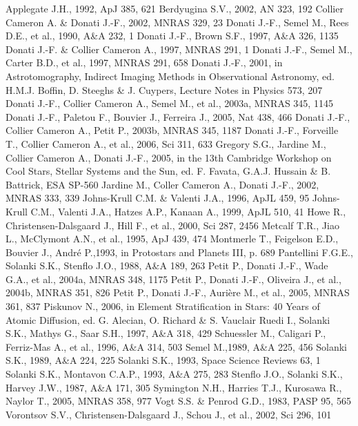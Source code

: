 \documentclass[11pt,twoside]{article}
\begin{document}
\begin{thebibliography}{}
\bibitem[]{} Applegate J.H., 1992, ApJ 385, 621
\bibitem[]{} Berdyugina S.V., 2002, AN 323, 192
\bibitem[]{} Collier Cameron A. \& Donati J.-F., 2002, MNRAS 329, 23
\bibitem[]{} Donati J.-F., Semel M., Rees D.E., et al., 1990, A\&A 232, 1
\bibitem[]{} Donati J.-F., Brown S.F., 1997, A\&A 326, 1135 
\bibitem[]{} Donati J.-F. \& Collier Cameron A., 1997, MNRAS 291, 1
\bibitem[]{} Donati J.-F., Semel M., Carter B.D., et al., 1997, MNRAS 291, 658
\bibitem[]{} Donati J.-F., 2001, in Astrotomography, Indirect Imaging Methods in Observational Astronomy, ed. H.M.J. Boffin, D. Steeghs \& J. Cuypers, Lecture Notes in Physics 573, 207
\bibitem[]{} Donati J.-F., Collier Cameron A., Semel M., et al., 2003a, MNRAS 345, 1145
\bibitem[]{} Donati J.-F., Paletou F., Bouvier J., Ferreira J., 2005, Nat 438, 466
\bibitem[]{} Donati J.-F., Collier Cameron A., Petit P., 2003b, MNRAS 345, 1187
\bibitem[]{} Donati J.-F., Forveille T., Collier Cameron A., et al., 2006, Sci 311, 633
\bibitem[]{} Gregory S.G., Jardine M., Collier Cameron A., Donati J.-F., 2005, in the 13th Cambridge Workshop on Cool Stars, Stellar Systems and the Sun, ed. F. Favata, G.A.J. Hussain \& B. Battrick, ESA SP-560
\bibitem[]{} Jardine M., Coller Cameron A., Donati J.-F., 2002, MNRAS 333, 339
\bibitem[]{} Johns-Krull C.M. \& Valenti J.A., 1996, ApJL 459, 95
\bibitem[]{} Johns-Krull C.M., Valenti J.A., Hatzes A.P., Kanaan A., 1999, ApJL 510, 41
\bibitem[]{} Howe R., Christensen-Dalsgaard J., Hill F., et al., 2000, Sci 287, 2456
\bibitem[]{} Metcalf T.R., Jiao L., McClymont A.N., et al., 1995, ApJ 439, 474
\bibitem[]{} Montmerle T., Feigelson E.D., Bouvier J., Andr\'e P.,1993, in Protostars and Planets III, p. 689 
\bibitem[]{} Pantellini F.G.E., Solanki S.K., Stenflo J.O., 1988, A\&A 189, 263
\bibitem[]{} Petit P., Donati J.-F., Wade G.A., et al., 2004a, MNRAS 348, 1175
\bibitem[]{} Petit P., Donati J.-F., Oliveira J., et al., 2004b, MNRAS 351, 826
\bibitem[]{} Petit P., Donati J.-F., Auri\`ere M., et al., 2005, MNRAS 361, 837
\bibitem[]{} Piskunov N., 2006, in Element Stratification in Stars: 40 Years of Atomic Diffusion, ed. G. Alecian, O. Richard \& S. Vauclair
\bibitem[]{} Ruedi I., Solanki S.K., Mathys G., Saar S.H., 1997, A\&A 318, 429
\bibitem[]{} Schuessler M., Caligari P., Ferriz-Mas A., et al., 1996, A\&A 314, 503
\bibitem[]{} Semel M.,1989, A\&A 225, 456
\bibitem[]{} Solanki S.K., 1989, A\&A 224, 225
\bibitem[]{} Solanki S.K., 1993, Space Science Reviews 63, 1
\bibitem[]{} Solanki S.K., Montavon C.A.P., 1993, A\&A 275, 283
\bibitem[]{} Stenflo J.O., Solanki S.K., Harvey J.W., 1987, A\&A 171, 305
\bibitem[]{} Symington N.H., Harries T.J., Kurosawa R., Naylor T., 2005, MNRAS 358, 977 
\bibitem[]{} Vogt S.S. \& Penrod G.D., 1983, PASP 95, 565
\bibitem[]{} Vorontsov S.V., Christensen-Dalsgaard J., Schou J., et al., 2002, Sci 296, 101
\end{thebibliography}
\end{document}
